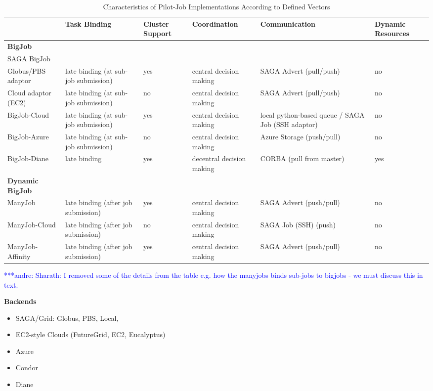 \documentclass[]{article}
\newcommand{\alnote}[1]{ {\textcolor{blue} { ***andre: #1 }}}
\newcommand{\alnote}[1]{}
\begin{document}
\begin{table}[t]
\begin{tabular}{|l|p{2.5cm}|p{2cm}|p{2cm}|p{2cm}|p{2cm}|}
	\hline
	&\textbf{Task Binding} &\textbf{Cluster Support} &\textbf{Coordina\-tion} & \textbf{Communica\-tion} &\textbf{Dynamic Resources}\\
	\hline
	\textbf{BigJob} & &&&&\\
	\hline
	SAGA BigJob & &&&&\\
	\hline
	\hspace{4mm} Globus/PBS adaptor  &late binding (at sub-job submission)  
									 &yes &central decision making &SAGA Advert (pull/push) &no\\  
	\hline
	\hspace{4mm} Cloud adaptor (EC2) &late binding (at sub-job submission)  
									 &no &central decision making &SAGA Advert (pull/push) &no\\ 
	\hline
 	BigJob-Cloud &late binding (at sub-job submission) &yes &central decision making 
				 &local python-based queue / SAGA Job (SSH adaptor) &no\\ 
	\hline
	BigJob-Azure &late binding (at sub-job submission)
	             &no &central decision making &Azure Storage (push/pull) &no\\ 
	\hline
    BigJob-Diane &late binding  &yes &decentral decision making &CORBA (pull from master) &yes\\ 
	\hline	
	\textbf{Dynamic BigJob} & &&&&\\
	\hline
    ManyJob &late binding (after job submission) &yes &central decision making &SAGA Advert (push/pull) &no\\
	\hline
 	ManyJob-Cloud &late binding (after job submission) &no &central decision making &SAGA Job (SSH) (push) &no\\
	\hline 
	ManyJob-Affinity &late binding (after job submission)
	&yes &central decision making &SAGA Advert (push/pull) &no\\
	\hline
\end{tabular}
\caption{Characteristics of Pilot-Job Implementations According 
		to Defined Vectors}
\end{table}		
\alnote{Sharath: I removed some of the details from the table e.g. how the 
manyjobs binds sub-jobs to bigjobs - we must discuss this in text.}
		
\vspace{10 mm}

\textbf{Backends}
\begin{itemize}
    \item SAGA/Grid: Globus, PBS, Local, 
    \item EC2-style Clouds (FutureGrid, EC2, Eucalyptus)
    \item Azure
    \item Condor
    \item Diane
\end{itemize}
\end{document}

